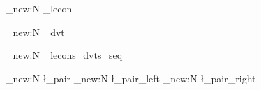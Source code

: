 
\usepackage{tocloft}

\ExplSyntaxOn
\makeatletter

\str_new:N \g_lecon%

\newcommand{\lec}[2]{%
	\str_set:Nn \g_lecon {#1}%
	\section{#1\ - #2~(\nbdvts{#1}/2)}%
	\label{lec:#1}%
}%

\newcommand\lecref[1]{\nameref{lec:#1}}

\str_new:N \g_dvt%

\newcommand{\dvt}[2]{%
	\str_set:Nn \g_dvt {#1}%
	\section{#2}%
	\label{dvt:#1}%
}%

\newcommand\dvtref[1]{\nameref{dvt:#1}}

\seq_new:N \g_lecons_dvts_seq%

\newcommand{\DeclarerLecon}[1]{
	\seq_if_exist:cF {g_lecon#1_dvts_seq} {%
		\seq_new:c {g_lecon#1_dvts_seq}%
		\seq_gput_right:Nn \g_lecons_dvts_seq {#1}%
	}
}

\newcommand{\lierLeconDvt}[3]{%
	\DeclarerLecon{#1}
	\seq_gput_right:cx {g_lecon#1_dvts_seq}{#2,#3}%
}%

\newcommand{\vadans}[2][ok]{
	\lierLeconDvt{#2}{\g_dvt}{#1}
	\item[\smiley{#1}] \nameref{lec:#2}
}

\newcommand{\getlecon}{
	\g_lecon
}

\seq_new:N \l_pair
\tl_new:N \l_pair_left
\tl_new:N \l_pair_right

\newcommand{\nbdvts}[1]{
	\seq_if_exist:NTF \g_lecons_dvts_seq_stored {%
		\seq_count:c {g_lecon#1_dvts_seq_stored}
	} { RECOMPILE }
}

\newcommand{\calclnbdvtsprec}[1]{
	
}

\newcommand{\ListerDvts}[1]{
	\seq_if_exist:NTF \g_lecons_dvts_seq_stored {%
		\int_case:nnF { \seq_count:c {g_lecon#1_dvts_seq_stored} } {
			{ 0 } { Aucun. }
		} {%
			\begin{itemize}
			\seq_map_inline:cn {g_lecon#1_dvts_seq_stored} {%
				\seq_set_split:Nnn \l_pair {,} {##1}%
				\seq_pop:NN \l_pair \l_pair_left
				\seq_pop:NN \l_pair \l_pair_right
				\item[\smiley{\l_pair_right}] \nameref{dvt:\l_pair_left}%
			}%
			\end{itemize}
		}
	} { RECOMPILE }
}

